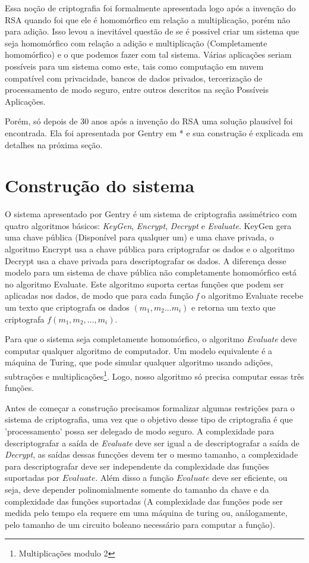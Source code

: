 Essa noção de criptografia foi formalmente apresentada logo após a invenção do RSA quando foi que ele é homomórfico em relação a multiplicação, porém não para adição.
Isso levou a inevitável questão de se é possivel criar um sistema que seja homomórfico com relação a adição e multiplicação (Completamente homomórfico) e o que podemos fazer com tal sistema.
Várias aplicações seriam possíveis para um sistema como este, tais como computação em nuvem compatível com privacidade, bancos de dados privados, tercerização de processamento de modo seguro, entre outros descritos na seção Possíveis Aplicações.

Porém, só depois de 30 anos após a invenção do RSA uma solução plausível foi encontrada.
Ela foi apresentada por Gentry em * e sua construção é explicada em detalhes na próxima seção.

\section{Construção do sistema}\label{sec:LABEL_CHP_1_SEC_C}
O sistema apresentado por Gentry é um sistema de criptografia assimétrico com quatro algoritmos básicos: \textit{KeyGen}, \textit{Encrypt}, \textit{Decrypt} e \textit{Evaluate}. KeyGen gera uma chave pública (Disponível para qualquer um) e uma chave privada, o algoritmo Encrypt usa a chave pública para criptografar os dados e o algoritmo Decrypt usa a chave privada para descriptografar os dados. A diferença desse modelo para um sistema de chave pública não completamente homomórfico está no algoritmo Evaluate. Este algoritmo suporta certas funções que podem ser aplicadas nos dados, de modo que para cada função \textit{f} o algoritmo Evaluate recebe um texto que criptografa os dados \((m_1,m_2...m_i)\) e retorna um texto que criptografa \( f(m_1,m_2,...,m_i) \).

Para que o sistema seja completamente homomórfico, o algoritmo \textit{Evaluate} deve computar qualquer algoritmo de computador. Um modelo equivalente é a máquina de Turing, que pode simular qualquer algoritmo usando adições, subtrações e multiplicações\footnote{Multiplicações modulo 2}. Logo, nosso algoritmo só precisa computar essas três funções.

Antes de começar a construção precisamos formalizar algumas restrições para o sistema de criptografia, uma vez que o objetivo desse tipo de criptografia é que 'processamento' possa ser delegado de modo seguro. A complexidade para descriptografar a saída de \textit{Evaluate} deve ser igual a de descriptografar a saída de \textit{Decrypt}, as saídas dessas funcções devem ter o mesmo tamanho, a complexidade para descriptografar deve ser independente da complexidade das funções suportadas por \(Evaluate\). Além disso a função \(Evaluate\) deve ser eficiente, ou seja, deve depender polinomialmente somente do tamanho da chave e da complexidade das funções suportadas (A complexidade das funções pode ser medida pelo tempo ela requere em uma máquina de turing ou, análogamente, pelo tamanho de um circuito boleano necessário para computar a função).

